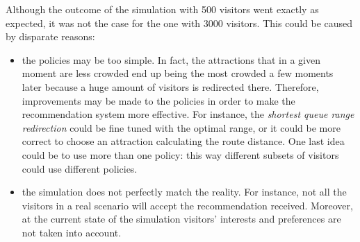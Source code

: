 Although the outcome of the simulation with 500 visitors went exactly as expected, it was not the case for the one with 3000 visitors.
This could be caused by disparate reasons:
\begin{itemize}
    \item the policies may be too simple.
    In fact, the attractions that in a given moment are less crowded end up being the most crowded a few moments later because a huge amount of visitors is redirected there.
    Therefore, improvements may be made to the policies in order to make the recommendation system more effective.
    For instance, the \textit{shortest queue range redirection} could be fine tuned with the optimal range, or it could be more correct to choose an attraction calculating the route distance.
    One last idea could be to use more than one policy: this way different subsets of visitors could use different policies.
    \item the simulation does not perfectly match the reality.
    For instance, not all the visitors in a real scenario will accept the recommendation received.
    Moreover, at the current state of the simulation visitors’ interests and preferences are not taken into account.
\end{itemize}
